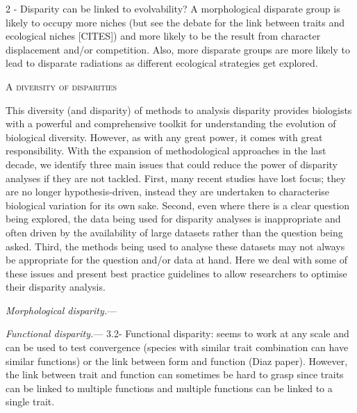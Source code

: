 \documentclass[12pt,letterpaper]{article}
\renewcommand{\section}[1]{%
\bigskip
\begin{center}
\begin{Large}
\normalfont\scshape #1
\medskip
\end{Large}
\end{center}}
\renewcommand{\subsubsection}[1]{%
\vspace{2ex}
\noindent
\textit{#1.}---}
\begin{document}
2 - Disparity can be linked to evolvability? A morphological disparate group is likely to occupy more niches (but see the debate for the link between traits and ecological niches [CITES]) and more likely to be the result from character displacement and/or competition.
Also, more disparate groups are more likely to lead to disparate radiations as different ecological strategies get explored.




\section{A diversity of disparities}
This diversity (and disparity) of methods to analysis disparity provides biologists with a powerful and comprehensive toolkit for understanding the evolution of biological diversity.
However, as with any great power, it comes with great responsibility. 
With the expansion of methodological approaches in the last decade, we identify three main issues that could reduce the power of disparity analyses if they are not tackled.
First, many recent studies have lost focus; they are no longer hypothesis-driven, instead they are undertaken to characterise biological variation for its own sake.
Second, even where there is a clear question being explored, the data being used for disparity analyses is inappropriate and often driven by the availability of large datasets rather than the question being asked.
Third, the methods being used to analyse these datasets may not always be appropriate for the question and/or data at hand.
Here we deal with some of these issues and present best practice guidelines to allow researchers to optimise their disparity analysis.


\subsubsection{Morphological disparity}

\subsubsection{Functional disparity}
3.2- Functional disparity: seems to work at any scale and can be used to test convergence (species with similar trait combination can have similar functions) or the link between form and function (Diaz paper). However, the link between trait and function can sometimes be hard to grasp since traits can be linked to multiple functions and multiple functions can be linked to a single trait.
\end{document}
